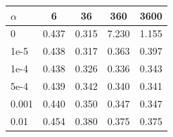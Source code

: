 \begin{tabular}{l c c c c}
\toprule
$\alpha$ & 6 & 36 & 360 & 3600 \\
\midrule
0 & 0.437 & 0.315 & 7.230 & 1.155 \\
1e-5 & 0.438 & 0.317 & 0.363 & 0.397 \\
1e-4 & 0.438 & 0.326 & 0.336 & 0.343 \\
5e-4 & 0.439 & 0.342 & 0.340 & 0.341 \\
0.001 & 0.440 & 0.350 & 0.347 & 0.347 \\
0.01 & 0.454 & 0.380 & 0.375 & 0.375 \\
\bottomrule
\end{tabular}